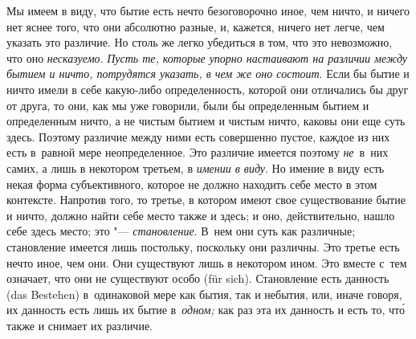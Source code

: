 Мы имеем в виду, что бытие есть нечто безоговорочно иное, чем ничто, и ничего
нет яснее того, что они абсолютно разные, и, кажется, ничего нет легче, чем
указать это различие. Но столь же легко убедиться в том, что это невозможно,
что оно {\em несказуемо}. {\em Пусть те, которые упорно настаивают на
различии между бытием и ничто, потрудятся указать, в чем же оно состоит}. Если
бы бытие и ничто имели в себе какую-либо определенность, которой они отличались
бы друг от друга, то они, как мы уже говорили, были бы определенным бытием и
определенным ничто, а не чистым бытием и чистым ничто, каковы они еще суть
здесь. Поэтому различие между ними есть совершенно пустое, каждое из них есть
в~равной мере неопределенное. Это различие имеется поэтому {\em не}~в~них
самих, а лишь в некотором третьем, в {\em имении в виду}. Но имение в виду есть
некая форма субъективного, которое не должно находить себе место в этом
контексте. Напротив того, то третье, в котором имеют свое существование бытие и
ничто, должно найти себе место также и здесь; и оно, действительно, нашло себе
здесь место; это "--- {\em становление}. В~нем они суть как различные;
становление имеется лишь постольку, поскольку они различны. Это третье есть
нечто иное, чем они. Они существуют лишь в некотором ином. Это вместе с~тем
означает, что они не существуют особо (für sich). Становление есть данность
(das Bestehen) в~одинаковой мере как бытия, так и небытия, или, иначе говоря,
их данность есть лишь их бытие в~{\em одном;} как раз эта их данность и есть
то, чт\'{о} также и снимает их различие.

